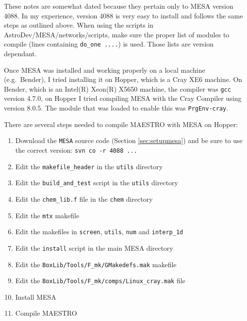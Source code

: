 These notes are somewhat dated because they pertain only to {\sf MESA} version 
4088. In my experience, version 4088 is 
very easy to install and follows the same steps as outlined above. When using 
the scripts in 
{\sf AstroDev/MESA/networks/scripts}, make sure the proper list of modules to 
compile (lines containing {\tt do\_one ....}) is used. Those lists are 
version dependant.

Once {\sf MESA} was installed and working properly on a local machine (e.g.\ 
Bender), I tried installing it on Hopper, which is a Cray XE6 machine. On 
Bender, which is an Intel(R) Xeon(R) X5650 machine, the compiler was 
{\tt gcc} version 4.7.0, on Hopper I tried compiling {\sf MESA} with the 
Cray Compiler using version 8.0.5. The module that was loaded to enable this 
was {\tt PrgEnv-cray}.

There are several steps needed to compile {\sf MAESTRO} with {\sf MESA} on 
Hopper:
\begin{enumerate}
\item Download the {\tt MESA} source code (Section \ref{sec:setupmesa}) and 
be sure to use the correct version: {\tt svn co -r 4088 ...}
\item Edit the {\tt makefile\_header} in the {\tt utils} directory
\item Edit the {\tt build\_and\_test} script in the {\tt utils} directory
\item Edit the {\tt chem\_lib.f} file in the {\tt chem} directory
\item Edit the {\tt mtx} makefile
\item Edit the makefiles in {\tt screen}, {\tt utils}, {\tt num} and 
{\tt interp\_1d}
\item Edit the {\tt install} script in the main {\sf MESA} directory
\item Edit the {\tt BoxLib/Tools/F\_mk/GMakedefs.mak} makefile
\item Edit the {\tt BoxLib/Tools/F\_mk/comps/Linux\_cray.mak} file
\item Install {\sf MESA}
\item Compile {\sf MAESTRO}
\end{enumerate}

